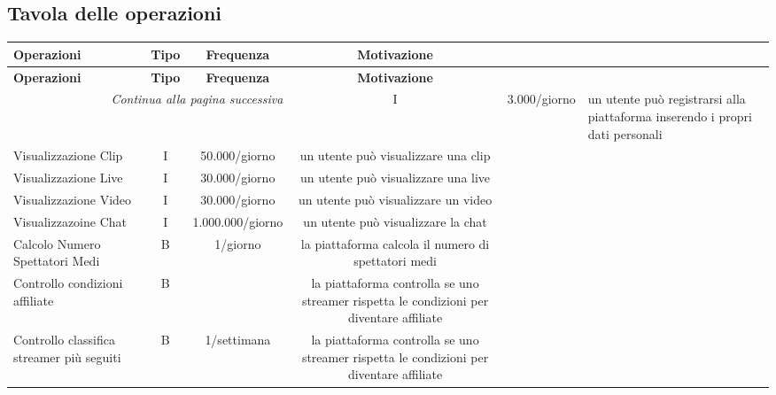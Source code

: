 \subsection{Tavola delle operazioni}
\small
\begin{longtable}{|l|c|c|c|c|p{4.18cm}|}
  \hline \textbf{Operazioni} & \textbf{Tipo} & \textbf{Frequenza} & \textbf{Motivazione} \\\hline
  \endfirsthead

  \hline \textbf{Operazioni} & \textbf{Tipo} & \textbf{Frequenza} & \textbf{Motivazione} \\\hline
  \endhead

  \hline \multicolumn{3}{|r|}{\textit{Continua alla pagina successiva}}
  \endfoot
  
  \hline
  \endlastfoot

  Registrazione & I & 3.000/giorno & un utente può registrarsi alla piattaforma inserendo i propri dati personali \\\hline
  Visualizzazione Clip & I & 50.000/giorno & un utente può visualizzare una clip  \\\hline
  Visualizzazione Live & I & 30.000/giorno & un utente può visualizzare una live  \\\hline
  Visualizzazione Video & I & 30.000/giorno & un utente può visualizzare un video  \\\hline
  Visualizzazoine Chat & I & 1.000.000/giorno & un utente può visualizzare la chat  \\\hline
  Calcolo Numero Spettatori Medi & B & 1/giorno  & la piattaforma calcola il numero di spettatori medi  \\\hline
  Controllo condizioni affiliate & B &  & la piattaforma controlla se uno streamer rispetta le condizioni per diventare affiliate  \\\hline
  Controllo classifica streamer più seguiti & B & 1/settimana  & la piattaforma controlla se uno streamer rispetta le condizioni per diventare affiliate  \\\hline

  
\end{longtable}
\normalsize
